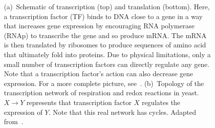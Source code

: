 \begin{figure}[ht]
\centering
{}
\caption{(a)~Schematic of transcription (top) and translation (bottom).
Here, a transcription factor (TF) binds to DNA close to a gene in a way that
increases gene expression by encouraging RNA polymerase (RNAp) to transcribe
the gene and so produce mRNA.  The mRNA is then translated by ribosomes to
produce sequences of amino acid that ultimately fold into proteins.
Due to physical limitations, only a small number of transcription factors can
directly regulate any gene. Note that a transcription factor's action can also
decrease gene expression. For a more complete picture, \eg see~\cite{Alon:2006}.
(b)~Topology of the transcription network of respiration and redox reactions in
yeast. $X \rightarrow Y$ represents that transcription factor $X$ regulates the
expression of $Y$. Note that this real network has cycles.
Adapted from~\cite{Murray:2011}.}
\end{figure}

